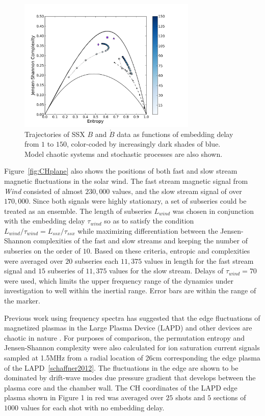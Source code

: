 \documentclass[aps,pre,twocolumn,secnumarabic,nobalancelastpage,amsmath,amssymb,
nofootinbib]{revtex4-1}
\begin{document}
\begin{figure}[!htbp]
\centerline{
\includegraphics[width=8.5cm]{fig3.png}}
\caption{\label{fig:embedscan}Trajectories of SSX $B$ and $\dot{B}$ data as functions of embedding delay from $1$ to $150$, color-coded by increasingly dark shades of blue. Model chaotic systems and stochastic processes are also shown.}
\end{figure} 

Figure~\ref{fig:CHplane} also shows the positions of both fast and slow stream magnetic fluctuations in the solar wind.  The fast stream magnetic signal from \textit{Wind} consisted of almost $230,000$ values, and the slow stream signal of over $170,000$. Since both signals were highly stationary, a set of subseries could be treated as an ensemble. The length of subseries $L_{wind}$ was chosen in conjunction with the embedding delay $\tau_{wind}$ so as to satisfy the condition $L_{wind}/\tau_{wind} = L_{ssx}/\tau_{ssx}$ while maximizing differentiation between the Jensen-Shannon complexities of the fast and slow streams and keeping the number of subseries on the order of $10$. Based on these criteria, entropic and complexities were averaged over $20$ subseries each $11,375$ values in length for the fast stream signal and $15$ subseries of $11,375$ values for the slow stream. Delays of $\tau_{wind} = 70$ were used, which limits the  upper frequency range of the dynamics under investigation to well within the inertial range. Error bars are within the range of the marker.

Previous work using frequency spectra has suggested that the edge fluctuations of magnetized plasmas in the Large Plasma Device (LAPD) and other devices are chaotic in nature \cite{maggs2012}. For purposes of comparison, the permutation entropy and Jensen-Shannon complexity were also calculated for ion saturation current signals sampled at 1.5MHz from a radial location of 26cm corresponding the edge plasma of the LAPD~\ref{schaffner2012}. The fluctuations in the edge are shown to be dominated by drift-wave modes due pressure gradient that develops between the plasma core and the chamber wall. The CH coordinates of the LAPD edge plasma shown in Figure 1 in red was averaged over $25$ shots and $5$ sections of $1000$ values for each shot with no embedding delay. 
\end{document}

